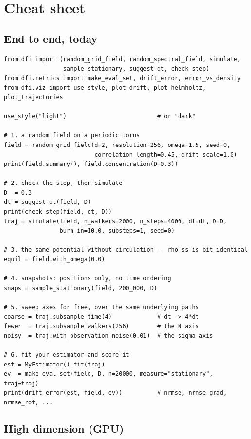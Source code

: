 \documentclass[11pt,a4paper]{article}
\begin{document}
\clearpage
\section{Cheat sheet}

\subsection*{End to end, today}

\begin{codebox}
\begin{lstlisting}
from dfi import (random_grid_field, random_spectral_field, simulate,
                 sample_stationary, suggest_dt, check_step)
from dfi.metrics import make_eval_set, drift_error, error_vs_density
from dfi.viz import use_style, plot_drift, plot_helmholtz, plot_trajectories

use_style("light")                          # or "dark"

# 1. a random field on a periodic torus
field = random_grid_field(d=2, resolution=256, omega=1.5, seed=0,
                          correlation_length=0.45, drift_scale=1.0)
print(field.summary(), field.concentration(D=0.3))

# 2. check the step, then simulate
D  = 0.3
dt = suggest_dt(field, D)
print(check_step(field, dt, D))
traj = simulate(field, n_walkers=2000, n_steps=4000, dt=dt, D=D,
                burn_in=10.0, substeps=1, seed=0)

# 3. the same potential without circulation -- rho_ss is bit-identical
equil = field.with_omega(0.0)

# 4. snapshots: positions only, no time ordering
snaps = sample_stationary(field, 200_000, D)

# 5. sweep axes for free, over the same underlying paths
coarse = traj.subsample_time(4)             # dt -> 4*dt
fewer  = traj.subsample_walkers(256)        # the N axis
noisy  = traj.with_observation_noise(0.01)  # the sigma axis

# 6. fit your estimator and score it
est = MyEstimator().fit(traj)
ev  = make_eval_set(field, D, n=20000, measure="stationary", traj=traj)
print(drift_error(est, field, ev))          # nrmse, nrmse_grad, nrmse_rot, ...
\end{lstlisting}
\end{codebox}

\subsection*{High dimension (GPU)}
\end{document}
